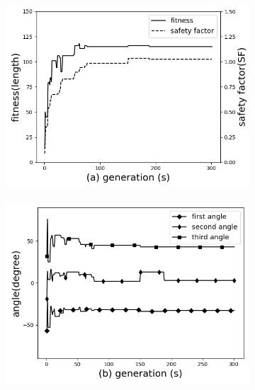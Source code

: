 \begin{figure}[!t]
	\centering
		\begin{subfigure}[b]{0.8\linewidth}
			\includegraphics[width=\linewidth]{Figures/chapter3/part2/image/Three_distinct_angles_fitness_and_sr.png}
		\end{subfigure}                                               
                                                                      
		\begin{subfigure}[b]{0.8\linewidth}                           
			\includegraphics[width=\linewidth]{Figures/chapter3/part2/image/three_distinct_angles_angle_change.png}
		\end{subfigure}                                               
                                                                      

\end{figure}
